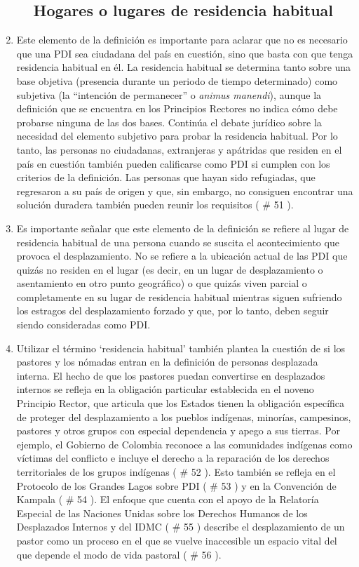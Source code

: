 \documentclass[
]{book}
\begin{document}
\begin{enumerate}
\begin{enumerate}
{    \subsection{Hogares o lugares de residencia habitual}\label{hogares-o-lugares-de-residencia-habitual}}
  \end{enumerate}
\item
  Este elemento de la definición es importante para aclarar que no es necesario que una PDI sea ciudadana del país en cuestión, sino que basta con que tenga residencia habitual en él. La residencia habitual se determina tanto sobre una base objetiva (presencia durante un periodo de tiempo determinado) como subjetiva (la ``intención de permanecer'' o \emph{animus manendi}), aunque la definición que se encuentra en los Principios Rectores no indica cómo debe probarse ninguna de las dos bases. Continúa el debate jurídico sobre la necesidad del elemento subjetivo para probar la residencia habitual. Por lo tanto, las personas no ciudadanas, extranjeras y apátridas que residen en el país en cuestión también pueden calificarse como PDI si cumplen con los criterios de la definición. Las personas que hayan sido refugiadas, que regresaron a su país de origen y que, sin embargo, no consiguen encontrar una solución duradera también pueden reunir los requisitos (
  \# 51
  ).
\item
  Es importante señalar que este elemento de la definición se refiere al lugar de residencia habitual de una persona cuando se suscita el acontecimiento que provoca el desplazamiento. No se refiere a la ubicación actual de las PDI que quizás no residen en el lugar (es decir, en un lugar de desplazamiento o asentamiento en otro punto geográfico) o que quizás viven parcial o completamente en su lugar de residencia habitual mientras siguen sufriendo los estragos del desplazamiento forzado y que, por lo tanto, deben seguir siendo consideradas como PDI.
\item
  Utilizar el término `residencia habitual' también plantea la cuestión de si los pastores y los nómadas entran en la definición de personas desplazada interna. El hecho de que los pastores puedan convertirse en desplazados internos se refleja en la obligación particular establecida en el noveno Principio Rector, que articula que los Estados tienen la obligación específica de proteger del desplazamiento a los pueblos indígenas, minorías, campesinos, pastores y otros grupos con especial dependencia y apego a sus tierras. Por ejemplo, el Gobierno de Colombia reconoce a las comunidades indígenas como víctimas del conflicto e incluye el derecho a la reparación de los derechos territoriales de los grupos indígenas (
  \# 52
  ). Esto también se refleja en el Protocolo de los Grandes Lagos sobre PDI (
  \# 53
  ) y en la Convención de Kampala (
  \# 54
  ). El enfoque que cuenta con el apoyo de la Relatoría Especial de las Naciones Unidas sobre los Derechos Humanos de los Desplazados Internos y del IDMC (
  \# 55
  ) describe el desplazamiento de un pastor como un proceso en el que se vuelve inaccesible un espacio vital del que depende el modo de vida pastoral (
  \# 56
  ).


\end{enumerate}
\end{document}

